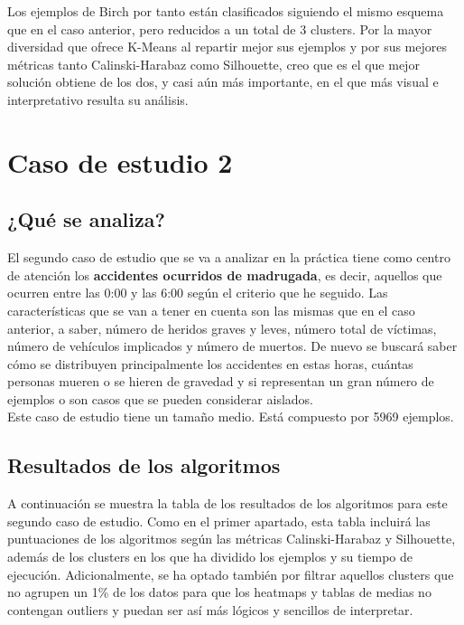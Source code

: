 	Los ejemplos de Birch por tanto están clasificados siguiendo el mismo esquema que en el caso anterior, pero reducidos a un total de 3 clusters. Por la mayor diversidad que ofrece K-Means al repartir mejor sus ejemplos y por sus mejores métricas tanto Calinski-Harabaz como Silhouette, creo que es el que mejor solución obtiene de los dos, y casi aún más importante, en el que más visual e interpretativo resulta su análisis.
	
	\section{Caso de estudio 2}
	
	\subsection{¿Qué se analiza?}
	El segundo caso de estudio que se va a analizar en la práctica tiene como centro de atención los \textbf{accidentes ocurridos de madrugada}, es decir, aquellos que ocurren entre las 0:00 y las 6:00 según el criterio que he seguido. Las características que se van a tener en cuenta son las mismas que en el caso anterior, a saber, número de heridos graves y leves, número total de víctimas, número de vehículos implicados y número de muertos. De nuevo se buscará saber cómo se distribuyen principalmente los accidentes en estas horas, cuántas personas mueren o se hieren de gravedad y si representan un gran número de ejemplos o son casos que se pueden considerar aislados.\\
	
	Este caso de estudio tiene un tamaño medio. Está compuesto por 5969 ejemplos.
	
	\subsection{Resultados de los algoritmos}
	
	A continuación se muestra la tabla de los resultados de los algoritmos para este segundo caso de estudio. Como en el primer apartado, esta tabla incluirá las puntuaciones de los algoritmos según las métricas Calinski-Harabaz y Silhouette, además de los clusters en los que ha dividido los ejemplos y su tiempo de ejecución. Adicionalmente, se ha optado también por filtrar aquellos clusters que no agrupen un 1\% de los datos para que los heatmaps y tablas de medias no contengan outliers y puedan ser así más lógicos y sencillos de interpretar.
	
